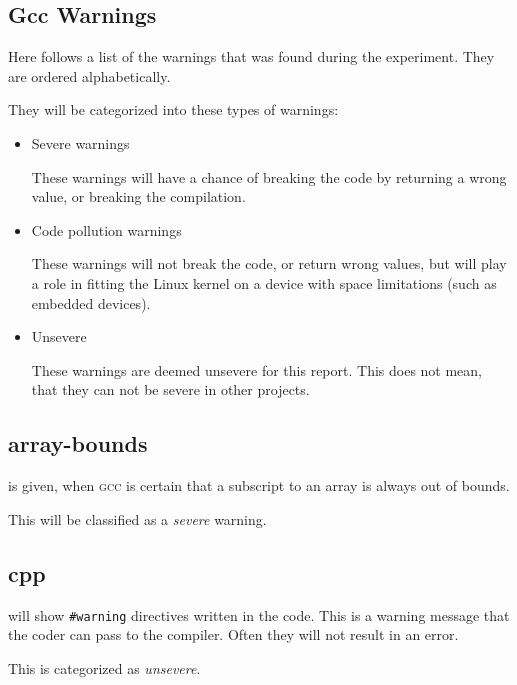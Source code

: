 \documentclass[a4paper,11pt]{report}
\newcommand{\textcode}[1]{
    \fboxsep=1pt
    \texttt{\colorbox{gray!20}{#1}}
}
\newcommand{\figa}{
    \begin{figure}[!htpb]
    \centering
}
\newcommand{\figb}[2]{
    \caption{#1}
    \label{#2}
    \end{figure}
}
\begin{document}
            \subsection{Gcc Warnings}
Here follows a list of the warnings that was found during the experiment.
They are ordered alphabetically. 

They will be categorized into these types of warnings:

\begin{itemize}
    \item Severe warnings

These warnings will have a chance of breaking the code by returning a wrong
value, or breaking the compilation.

    \item Code pollution warnings

These warnings will not break the code, or return wrong values, but will play a 
role in fitting the Linux kernel on a device with space limitations (such as 
embedded devices).

    \item Unsevere

These warnings are deemed unsevere for this report. This does not mean, that 
they can not be severe in other projects.

\end{itemize}


            \subsection*{array-bounds}
is given, when \textsc{gcc} is certain that a subscript to an array is always 
out of bounds.

This will be classified as a \emph{severe} warning.




            \subsection*{cpp}
will show \textcode{\#warning} directives written in the code. This is a warning
message that the coder can pass to the compiler. Often they will not result in 
an error.

This is categorized as \emph{unsevere}.
\end{document}
